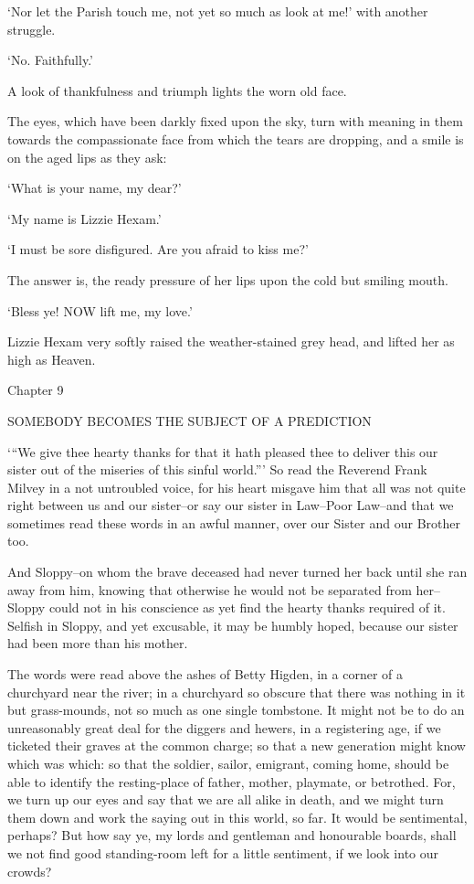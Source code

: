 ‘Nor let the Parish touch me, not yet so much as look at me!’ with
another struggle.

‘No. Faithfully.’

A look of thankfulness and triumph lights the worn old face.

The eyes, which have been darkly fixed upon the sky, turn with meaning
in them towards the compassionate face from which the tears are
dropping, and a smile is on the aged lips as they ask:

‘What is your name, my dear?’

‘My name is Lizzie Hexam.’

‘I must be sore disfigured. Are you afraid to kiss me?’

The answer is, the ready pressure of her lips upon the cold but smiling
mouth.

‘Bless ye! NOW lift me, my love.’

Lizzie Hexam very softly raised the weather-stained grey head, and
lifted her as high as Heaven.



Chapter 9

SOMEBODY BECOMES THE SUBJECT OF A PREDICTION


‘“We give thee hearty thanks for that it hath pleased thee to deliver
this our sister out of the miseries of this sinful world.”’ So read the
Reverend Frank Milvey in a not untroubled voice, for his heart misgave
him that all was not quite right between us and our sister--or say our
sister in Law--Poor Law--and that we sometimes read these words in an
awful manner, over our Sister and our Brother too.

And Sloppy--on whom the brave deceased had never turned her back until
she ran away from him, knowing that otherwise he would not be separated
from her--Sloppy could not in his conscience as yet find the hearty
thanks required of it. Selfish in Sloppy, and yet excusable, it may be
humbly hoped, because our sister had been more than his mother.

The words were read above the ashes of Betty Higden, in a corner of a
churchyard near the river; in a churchyard so obscure that there was
nothing in it but grass-mounds, not so much as one single tombstone.
It might not be to do an unreasonably great deal for the diggers and
hewers, in a registering age, if we ticketed their graves at the common
charge; so that a new generation might know which was which: so that the
soldier, sailor, emigrant, coming home, should be able to identify the
resting-place of father, mother, playmate, or betrothed. For, we turn up
our eyes and say that we are all alike in death, and we might turn
them down and work the saying out in this world, so far. It would
be sentimental, perhaps? But how say ye, my lords and gentleman and
honourable boards, shall we not find good standing-room left for a
little sentiment, if we look into our crowds?

